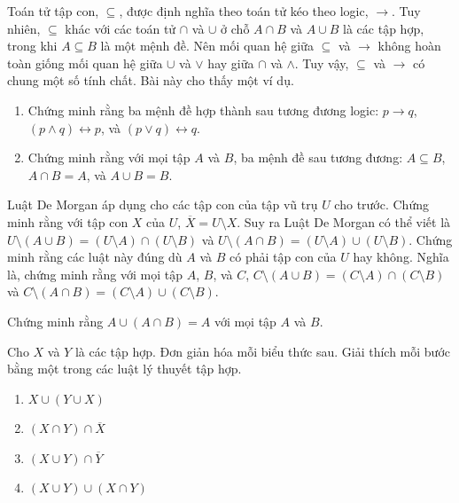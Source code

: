 \begin{exercise}
Toán tử tập con, $\subseteq$, được định nghĩa theo toán tử kéo theo logic, $\to$. Tuy nhiên, $\subseteq$ khác với các toán tử $\cap$ và $\cup$ ở chỗ $A \cap B$ và $A \cup B$ là các tập hợp, trong khi $A \subseteq B$ là một mệnh đề. Nên mối quan hệ giữa $\subseteq$ và $\to$ không hoàn toàn giống mối quan hệ giữa $\cup$ và $\lor$ hay giữa $\cap$ và $\land$. Tuy vậy, $\subseteq$ và $\to$ có chung một số tính chất. Bài này cho thấy một ví dụ.
\begin{enumerate}[label=\alph*)]
\item Chứng minh rằng ba mệnh đề hợp thành sau tương đương logic: $p \to q$, $(p \land q) \leftrightarrow p$, và $(p \lor q) \leftrightarrow q$.
\item Chứng minh rằng với mọi tập $A$ và $B$, ba mệnh đề sau tương đương: $A \subseteq B$, $A \cap B = A$, và $A \cup B = B$.
\end{enumerate}
\end{exercise}

\begin{exercise}
Luật De Morgan áp dụng cho các tập con của tập vũ trụ $U$ cho trước. Chứng minh rằng với tập con $X$ của $U$, $\overline{X} = U \setminus X$. Suy ra Luật De Morgan có thể viết là $U \setminus (A \cup B) = (U \setminus A) \cap (U \setminus B)$ và $U \setminus (A \cap B) = (U \setminus A) \cup (U \setminus B)$. Chứng minh rằng các luật này đúng dù $A$ và $B$ có phải tập con của $U$ hay không. Nghĩa là, chứng minh rằng với mọi tập $A$, $B$, và $C$, $C \setminus (A \cup B) = (C \setminus A) \cap (C \setminus B)$ và $C \setminus (A \cap B) = (C \setminus A) \cup (C \setminus B)$.
\end{exercise}

\begin{exercise}
Chứng minh rằng $A \cup (A \cap B) = A$ với mọi tập $A$ và $B$.
\end{exercise}

\begin{exercise}
Cho $X$ và $Y$ là các tập hợp. Đơn giản hóa mỗi biểu thức sau. Giải thích mỗi bước bằng một trong các luật lý thuyết tập hợp.
\begin{enumerate}[label=\alph*)]
\item $X \cup (Y \cup X)$
\item $(X \cap Y) \cap \overline{X}$
\item $(X \cup Y) \cap \overline{Y}$
\item $(X \cup Y) \cup (X \cap Y)$
\end{enumerate}
\end{exercise}

